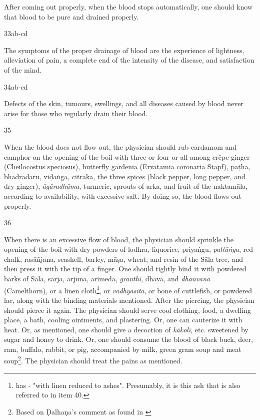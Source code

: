 \begin{translation}
After coming out properly, when the blood stops automatically, one should know that blood to be pure and drained properly.

\item[33ab-cd]

The symptoms of the proper drainage of blood are the experience of lightness, alleviation of pain, a complete end of the intensity of the disease, and satisfaction of the mind.

\item[34ab-cd] 

Defects of the skin, tumours, swellings, and all diseases caused by blood never arise for those who regularly drain their blood.

\item[35]

When the blood does not flow out, the physician should rub cardamom and camphor on the opening of the boil with three or four or all among crêpe ginger (Cheilocostus speciosus), butterfly gardenia (Ervatamia coronaria Stapf), \gls{pāṭhā}, \gls{bhadradāru}, \gls{viḍaṅga}, \gls{citraka}, the three spices (black pepper, long pepper, and dry ginger), \emph{āgāradhūma}, turmeric, sprouts of \gls{arka}, and fruit of the \gls{naktamāla}, according to availability, with excessive salt. By doing so, the blood flows out properly.

\item[36]

When there is an excessive flow of blood, the physician should sprinkle the opening of the boil with dry powders of \gls{lodhra}, liquorice, \gls{priyaṅgu}, \emph{pattāṅga}, red chalk, \gls{rasāñjana}, seashell, barley, \gls{māṣa}, wheat, and resin of the Sāla tree, and then press it with the tip of a finger. 
One should tightly bind it with powdered barks of Sāla, \gls{sarja}, \gls{arjuna}, \gls{arimeda}, \emph{granthi}, \gls{dhava}, and \emph{dhanvana} (Camelthorn), or a linen cloth\footnote{\cite[66]{vulgate} has  - "with linen reduced to ashes". Presumably, it is this ash that is also referred to in item 40.}, or \emph{vadhyāsita}, or bone of cuttlefish, or powdered lac, along with the binding materials mentioned. 
After the piercing, the physician should pierce it again. 
The physician should serve cool clothing, food, a dwelling place, a bath, cooling 
ointments, and plastering. Or, one can cauterize
it with heat. Or, as 
mentioned, one should give a decoction of \emph{kākolī}, etc. sweetened by sugar and honey to drink. 
Or, one should consume the blood of black buck, deer, ram, buffalo, rabbit, or pig, accompanied by milk, green gram soup and meat soup\footnote{Based on Ḍalhaṇa's comment as found in \cite[66]{vulgate}}. 
The physician should treat the pains as mentioned. 


\end{translation}
